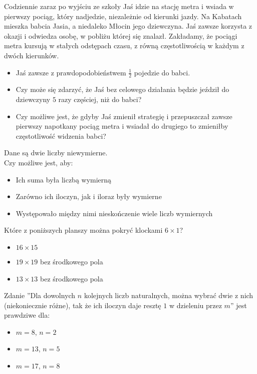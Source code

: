 \documentclass[12pt, a4paper]{article}
\newcommand{\question}[1]{\normalitem \begin{samepage}#1 \end{samepage}}
\begin{document}
\begin{enumerate}
	\question {
		Codziennie zaraz po wyjściu ze szkoły Jaś idzie na stację metra i wsiada w pierwszy pociąg, który nadjedzie, niezależnie od kierunki jazdy. Na Kabatach mieszka babcia Jasia, a
        niedaleko Młocin jego dziewczyna. Jaś zawsze korzysta z okazji i odwiedza osobę, w pobliżu której się znalazł. Zakładamy, że pociągi metra kursują w stałych odstępach czasu, z równą częstotliwością
        w każdym z dwóch kierunków.

		\begin{itemize}
			\item Jaś zawsze z prawdopodobieństwem $\frac{1}{2}$ pojedzie do babci.
			\item Czy może się zdarzyć, że Jaś bez celowego działania będzie jeździł do dziewczyny $5$ razy częściej, niż do babci?
			\item Czy możliwe jest, że gdyby Jaś zmienił strategię i przepuszczał zawsze pierwszy napotkany pociąg metra i wsiadał do drugiego to zmieniłby częstotliwość widzenia babci? 
		\end{itemize}
	}
	
	\question {
		Dane są dwie liczby niewymierne.\\ 
		Czy możliwe jest, aby:

		\begin{itemize}
			\item Ich suma była liczbą wymierną
			\item Zarówno ich iloczyn, jak i iloraz były wymierne
			\item Występowało między nimi nieskończenie wiele liczb wymiernych
		\end{itemize}
	}
	
	\question {
		Które z poniższych planszy można pokryć klockami $6 \times 1$?
		
		\begin{itemize}
			\item $16 \times 15$
            \item $19 \times 19$ bez środkowego pola
            \item $13 \times 13$ bez środkowego pola
		\end{itemize}
	}
	
	\question {
		Zdanie ''Dla dowolnych $n$ kolejnych liczb naturalnych, można wybrać dwie z nich (niekoniecznie różne), tak że ich iloczyn daje resztę $1$ w dzieleniu przez $m$'' jest prawdziwe dla:
		
		\begin{itemize}
			\item $m = 8$, $n = 2$
            \item $m = 13$, $n = 5$
            \item $m = 17$, $n = 8$
		\end{itemize}
	}
	

\end{enumerate}
\end{document}

